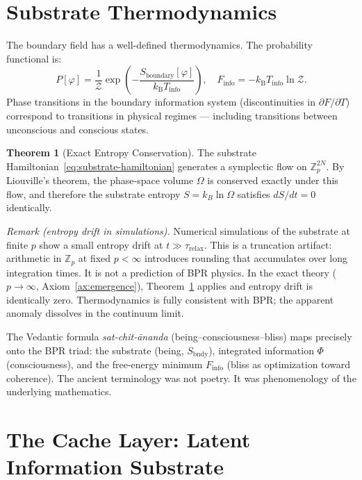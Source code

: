 \documentclass[12pt,oneside]{book}
\theoremstyle{definition}
\newtheorem{theorem}{Theorem}[chapter]
\newcommand{\kB}{k_{\mathrm{B}}}
\begin{document}
\section{Substrate Thermodynamics}

The boundary field has a well-defined thermodynamics. The probability functional is:
\begin{equation}
  P[\varphi] = \frac{1}{\mathcal{Z}}
  \exp\!\left(-\frac{S_{\mathrm{boundary}}[\varphi]}{\kB T_{\mathrm{info}}}\right),
  \quad
  F_{\mathrm{info}} = -\kB T_{\mathrm{info}}\ln\mathcal{Z}.
\end{equation}
Phase transitions in the boundary information system (discontinuities in
$\partial F/\partial T$) correspond to transitions in physical regimes ---
including transitions between unconscious and conscious states.

\begin{theorem}[Exact Entropy Conservation]
\label{thm:entropy-conservation}
  The substrate Hamiltonian~\eqref{eq:substrate-hamiltonian} generates a symplectic
  flow on $\mathbb{Z}_p^{2N}$. By Liouville's theorem, the phase-space volume
  $\Omega$ is conserved exactly under this flow, and therefore the substrate entropy
  $S = k_B \ln\Omega$ satisfies $dS/dt = 0$ identically.
\end{theorem}

\noindent\textit{Remark (entropy drift in simulations).}
Numerical simulations of the substrate at finite $p$ show a small entropy drift
at $t \gg \tau_{\mathrm{relax}}$. This is a truncation artifact: arithmetic in
$\mathbb{Z}_p$ at fixed $p < \infty$ introduces rounding that accumulates over
long integration times. It is not a prediction of BPR physics. In the exact
theory ($p \to \infty$, Axiom~\ref{ax:emergence}), Theorem~\ref{thm:entropy-conservation}
applies and entropy drift is identically zero. Thermodynamics is fully consistent
with BPR; the apparent anomaly dissolves in the continuum limit.

\begin{resonance}
The Vedantic formula \textit{sat-chit-\={a}nanda} (being--consciousness--bliss)
maps precisely onto the BPR triad: the substrate (being, $S_{\mathrm{bndy}}$),
integrated information $\Phi$ (consciousness), and the free-energy minimum
$F_{\mathrm{info}}$ (bliss as optimization toward coherence). The ancient
terminology was not poetry. It was phenomenology of the underlying mathematics.
\end{resonance}

\section{The Cache Layer: Latent Information Substrate}
\label{sec:cache}
\end{document}
